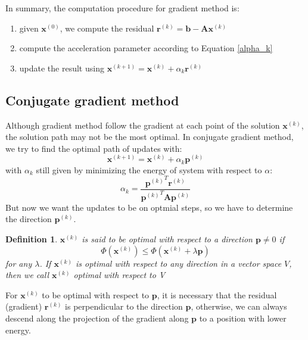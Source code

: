 \documentclass{article}
\newtheorem*{definition}{Definition}
\begin{document}
In summary, the computation procedure for gradient method is:
\begin{enumerate}
    \item given $\mathbf{x}^{(0)}$, we compute the residual 
        $\mathbf{r}^{(k)} = \mathbf{b} - \mathbf{A}\mathbf{x}^{(k)}$
    \item compute the acceleration parameter according to Equation \eqref{alpha_k}
    \item update the result using $\mathbf{x}^{(k+1)} = \mathbf{x}^{(k)} + \alpha_k \mathbf{r}^{(k)}$
\end{enumerate}

\subsection{Conjugate gradient method}
Although gradient method follow the gradient at each point of the solution $\mathbf{x}^{(k)}$,
the solution path may not be the most optimal. In conjugate gradient method, we try to find 
the optimal path of updates with:
\begin{equation}
    \label{cg_update}
    \mathbf{x}^{(k+1)} = \mathbf{x}^{(k)} + \alpha_k \mathbf{p}^{(k)}
\end{equation}
with $\alpha_k$ still given by minimizing the energy of system with respect to $\alpha$:
\begin{equation}
    \alpha_k = 
    \frac{\left.\mathbf{p}^{(k)}\right.^T \mathbf{r}^{(k)}}
    {\left.\mathbf{p}^{(k)}\right.^T \mathbf{A} \mathbf{p}^{(k)}}
\end{equation}
But now we want the updates to be on optmial steps, so we have to determine the 
direction $\mathbf{p}^{(k)}$.
\begin{definition}
    $\mathbf{x}^{(k)}$ is said to be \emph{optimal} with respect to a direction $\mathbf{p}\neq 0$
    if 
    \[\Phi(\mathbf{x}^{(k)})\leq \Phi(\mathbf{x}^{(k)} + \lambda \mathbf{p})\]
    for any $\lambda$. If $\mathbf{x}^{(k)}$ is optimal with respect to any direction in a vector 
    space $V$, then we call $\mathbf{x}^{(k)}$ \emph{optimal with respect to} V
\end{definition}
For $\mathbf{x}^{(k)}$ to be optimal with respect to $\mathbf{p}$, it is necessary that 
the residual (gradient) $\mathbf{r}^{(k)}$ is perpendicular to the direction $\mathbf{p}$,
otherwise, we can always descend along the projection of the gradient along $\mathbf{p}$
to a position with lower energy.
\end{document}
